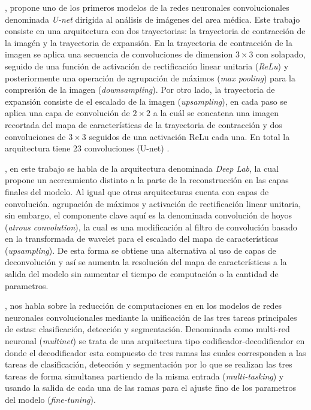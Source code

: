 \citet{DBLP:journals/corr/RonnebergerFB15}, propone uno de los primeros modelos de la redes neuronales convolucionales denominada \emph{U-net} dirigida al análisis de imágenes del area médica. Este trabajo consiste en una arquitectura con dos trayectorias: la trayectoria de contracción de la imagén y la trayectoria de expansión. En la trayectoria de contracción de la imagen se aplica una secuencia de convoluciones de dimension $3 \times 3$ con solapado, seguido de una función de activación de rectificación linear unitaria (\emph{ReLu}) y posteriormente una operación de agrupación de máximos (\emph{max pooling}) para la compresión de la imagen (\emph{downsampling}). Por otro lado, la trayectoria de expansión consiste de el escalado de la imagen (\emph{upsampling}), en cada paso se aplica una capa de convolución de $2 \times 2$ a la cuál se concatena una imagen recortada del mapa de características de la trayectoria de contracción y dos convoluciones de $3 \times 3$ seguidos de una activación ReLu cada una. En total la arquitectura tiene 23 convoluciones (U-net) .

\citet{DBLP:journals/corr/ChenPK0Y16}, en este trabajo se habla de la arquitectura denominada \emph{Deep Lab}, la cual propone un acercamiento distinto a la parte de la reconstrucción en las capas finales del modelo. Al igual que otras arquitecturas cuenta con capas de convolución. agrupación de máximos y activación de rectificación linear unitaria, sin embargo, el componente clave aquí es la denominada convolución de hoyos (\emph{atrous convolution}), la cual es una modificación al filtro de convolución basado en la transformada de wavelet para el escalado del mapa de características (\emph{upsampling}). De esta forma se obtiene una alternativa al uso de capas de deconvolución y así se aumenta la resolución del mapa de características a la salida del modelo sin aumentar el tiempo de computación o la cantidad de parametros.

\citet{DBLP:journals/corr/TeichmannWZCU16}, nos habla sobre la reducción de computaciones en en los modelos de redes neuronales convolucionales mediante la unificación de las tres tareas principales de estas: clasificación, detección y segmentación. Denominada como multi-red neuronal (\emph{multinet}) se trata de una arquitectura tipo codificador-decodificador en donde el decodificador esta compuesto de tres ramas las cuales corresponden a las tareas de clasificación, detección y segmentación por lo que se realizan las tres tareas de forma simultanea partiendo de la misma entrada (\emph{multi-tasking}) y usando la salida de cada una de las ramas para el ajuste fino de los parametros del modelo (\emph{fine-tuning}).  

